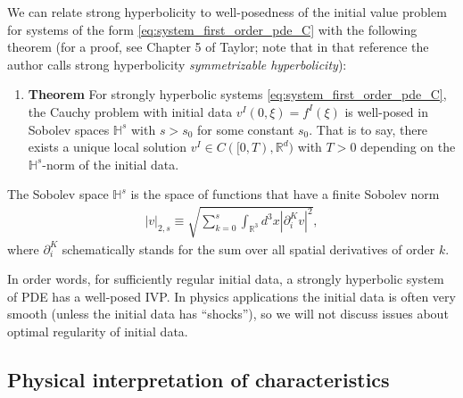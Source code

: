 \documentclass{ws-ijmpd}
\begin{document}
We can relate strong hyperbolicity to
well-posedness of the initial value problem for systems
of the form \eqref{eq:system_first_order_pde_C} with the following theorem
(for a proof, see Chapter 5 of Taylor\cite{Taylor1991}; note
that in that reference the author calls strong hyperbolicity
\emph{symmetrizable hyperbolicity}):
\begin{enumerate}
   \item [] \textbf{Theorem}
   For strongly hyperbolic systems \eqref{eq:system_first_order_pde_C}, 
   the Cauchy problem with initial data 
   $v^I (0, \xi) = f^I (\xi)$ is well-posed in Sobolev
   spaces $\mathbb{H}^s$ with $s > s_0$ for some constant $s_0$. 
   That is to say, there exists a unique local solution
   $v^I \in C([0, T ), \mathbb{R}^d)$ with $T > 0$ 
   depending on the $\mathbb{H}^s$-norm of the initial data.
\end{enumerate}
The Sobolev space $\mathbb{H}^s$ is the space of functions that
have a finite Sobolev norm
\begin{align}
   \left|v\right|_{2,s}
   \equiv
   \sqrt{
      \sum_{k=0}^s
      \int_{\mathbb{R}^3}d^3x 
      \left|\partial_i^{K}v\right|^2
   }
   ,
\end{align}
where $\partial_i^{K}$ schematically stands for the sum over all
spatial derivatives of order $k$. 

In order words, for sufficiently regular initial data, a strongly hyperbolic
system of PDE has a well-posed IVP.
In physics applications the initial data is often very smooth (unless
the initial data has ``shocks''),
so we will not discuss issues about optimal regularity of initial data.

\subsection{Physical interpretation of characteristics
\label{sec:physical_interpretation_characteristics}
}
\end{document}
